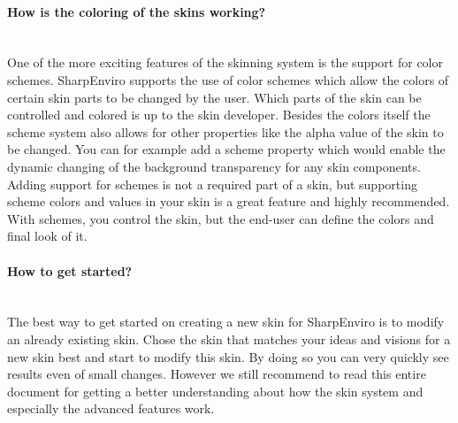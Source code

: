\paragraph{How is the coloring of the skins working?}\hspace{0cm}\\
One of the more exciting features of the skinning system is the support for color schemes. SharpEnviro supports the use of color schemes which allow the colors of certain skin parts to be changed by the user. Which parts of the skin can be controlled and colored is up to the skin developer. Besides the colors itself the scheme system also allows for other properties like the alpha value of the skin to be changed. You can for example add a scheme property which would enable the dynamic changing of the background transparency for any skin components. Adding support for schemes is not a required part of a skin, but supporting scheme colors and values in your skin is a great feature and highly recommended. With schemes, you control the skin, but the end-user can define the colors and final look of it.

\paragraph{How to get started?}\hspace{0cm}\\
The best way to get started on creating a new skin for SharpEnviro is to modify an already existing skin. Chose the skin that matches your ideas and visions for a new skin best and start to modify this skin. By doing so you can very quickly see results even of small changes. However we still recommend to read this entire document for getting a better understanding about how the skin system and especially the advanced features work.
